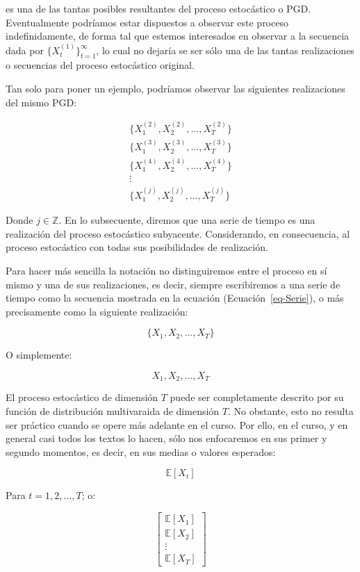 \documentclass[
  a4paper,
]{article}
\begin{document}
es una de las tantas posibles resultantes del proceso estocástico o PGD.
Eventualmente podríamos estar dispuestos a observar este proceso
indefinidamente, de forma tal que estemos interesados en observar a la
secuencia dada por \(\{ X^{(1)}_t \}^{\infty}_{t = 1}\), lo cual no
dejaría se ser sólo una de las tantas realizaciones o secuencias del
proceso estocástico original.

Tan solo para poner un ejemplo, podríamos observar las siguientes
realizaciones del mismo PGD:

\begin{eqnarray*}
  & \{X^{(2)}_1, X^{(2)}_2, \ldots, X^{(2)}_T\} & \\
  & \{X^{(3)}_1, X^{(3)}_2, \ldots, X^{(3)}_T\} & \\
  & \{X^{(4)}_1, X^{(4)}_2, \ldots, X^{(4)}_T\} & \\
  & \vdots & \\
  & \{X^{(j)}_1, X^{(j)}_2, \ldots, X^{(j)}_T\} &
\end{eqnarray*}

Donde \(j \in \mathbb{Z}\). En lo subsecuente, diremos que una serie de
tiempo es una realización del proceso estocástico subyacente.
Considerando, en consecuencia, al proceso estocástico con todas sus
posibilidades de realización.

Para hacer más sencilla la notación no distinguiremos entre el proceso
en sí mismo y una de sus realizaciones, es decir, siempre escribiremos a
una serie de tiempo como la secuencia mostrada en la ecuación
(Ecuación~\ref{eq-Serie}), o más precisamente como la siguiente
realización:

\[
\{ X_1, X_2, \ldots, X_T \}
\]

O simplemente:

\[
X_1, X_2, \ldots, X_T
\]

El proceso estocástico de dimensión \(T\) puede ser completamente
descrito por su función de distribución multivaraida de dimensión \(T\).
No obstante, esto no resulta ser práctico cuando se opere más adelante
en el curso. Por ello, en el curso, y en general casi todos los textos
lo hacen, sólo nos enfocaremos en sus primer y segundo momentos, es
decir, en sus medias o valores esperados:

\[
\mathbb{E}[X_t]
\]

Para \(t = 1, 2, \ldots, T\); o:

\[
\left[
    \begin{array}{c}
    \mathbb{E}[X_1] \\
    \mathbb{E}[X_2] \\
    \vdots \\
    \mathbb{E}[X_T]
    \end{array}
\right]
\]
\end{document}

